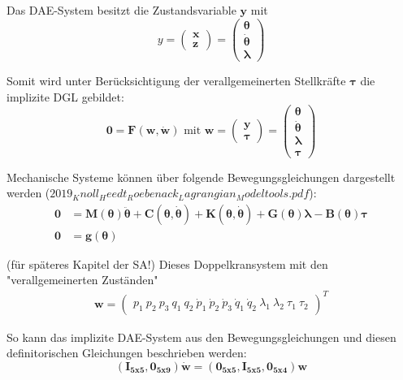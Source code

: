 Das DAE-System besitzt die Zustandsvariable $\pmb{y}$ mit
\begin{equation}
	y
	=
	\begin{pmatrix}
		\pmb{x} \\
		\hline
		\pmb{z}
	\end{pmatrix}
	=
	\begin{pmatrix}
		\pmb{\theta} \\
		\pmb{\dot{\theta}} \\
		\hline
		\pmb{\lambda}
	\end{pmatrix}
\end{equation}

Somit wird unter Berücksichtigung der verallgemeinerten Stellkräfte $\pmb{\tau}$ die implizite DGL gebildet:
\begin{equation}
	\pmb{0} = \pmb{F(w, \dot{w})} \text{ mit } \pmb{w} 
	=
	\begin{pmatrix}
		\pmb{y} \\
		\hline
		\pmb{\tau}
	\end{pmatrix}
	= 
	\begin{pmatrix}
		\pmb{\theta} \\
		\pmb{\dot{\theta}} \\
		\pmb{\lambda} \\
		\hline
		\pmb{\tau}
	\end{pmatrix}
\end{equation}

Mechanische Systeme können über folgende Bewegungsgleichungen dargestellt werden ($2019_Knoll_Heedt_Roebenack_Lagrangian_Modeltools.pdf$):
\begin{align}
	\pmb{0} &= \pmb{M}(\pmb{\theta}) \pmb{\ddot{\theta}} + \pmb{C}(\pmb{\theta}, \pmb{\dot{\theta}}) + \pmb{K}(\pmb{\theta}, \pmb{\dot{\theta}}) + \pmb{G}(\pmb{\theta}) \pmb{\lambda} - \pmb{B}(\pmb{\theta}) \pmb{\tau} \\
	\pmb{0} &= \pmb{g}(\pmb{\theta}) 
\end{align}

(für späteres Kapitel der SA!)
Dieses Doppelkransystem mit den "verallgemeinerten Zuständen"
\begin{align}
	\pmb{w}
	=
	\begin{pmatrix}
		p_1 \ p_2 \ p_3 \ q_1 \ q_2 \ \dot{p}_1 \ \dot{p}_2 \ \dot{p}_3 \ \dot{q}_1 \ \dot{q}_2 \ \lambda_1 \ \lambda_2 \ \tau_1 \ \tau_2
	\end{pmatrix}^T
\end{align}

So kann das implizite DAE-System aus den Bewegungsgleichungen und diesen definitorischen Gleichungen beschrieben werden:
\begin{equation}
	(\pmb{I_{5 x 5}}, \pmb{0_{5 x 9}}) \pmb{\dot{w}} = (\pmb{0_{5 x 5}}, \pmb{I_{5 x 5}}, \pmb{0_{5 x 4}}) \pmb{w}
\end{equation}

